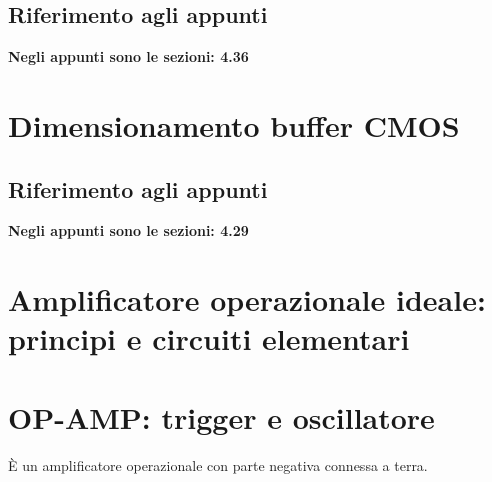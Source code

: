 \documentclass{article}
\numberwithin{equation}{subsection}
\begin{document}
	\subsection{Riferimento agli appunti}
	\textbf{Negli appunti sono le sezioni: 4.36}
	\section{Dimensionamento buffer CMOS}
	\subsection{Riferimento agli appunti}
	\textbf{Negli appunti sono le sezioni: 4.29}
	\section{Amplificatore operazionale ideale: principi e circuiti elementari}
	\section{OP-AMP: trigger e oscillatore}
	È un amplificatore operazionale con parte negativa connessa a terra.
\end{document}
